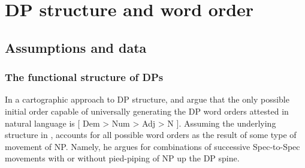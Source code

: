 \documentclass[output=paper]{langscibook}
\begin{document}
\section{DP structure and word order} 
\subsection{Assumptions and data}
\label{sec:baron:2.1}
\subsubsection{The functional structure of DPs}
\label{sec:baron:2.1.1}
In a cartographic approach to DP structure, \citet{Greenberg1963} and \citet{Cinque2005} argue that the only possible initial order capable of universally generating the DP word orders attested in natural language is [ Dem > Num > Adj > N ]. Assuming the underlying structure in , \citeauthor{Cinque2005} accounts for all possible word orders as the result of some type of movement of NP. Namely, he argues for combinations of successive Spec-to-Spec movements with or without pied-piping of NP up the DP spine. 
\end{document}
